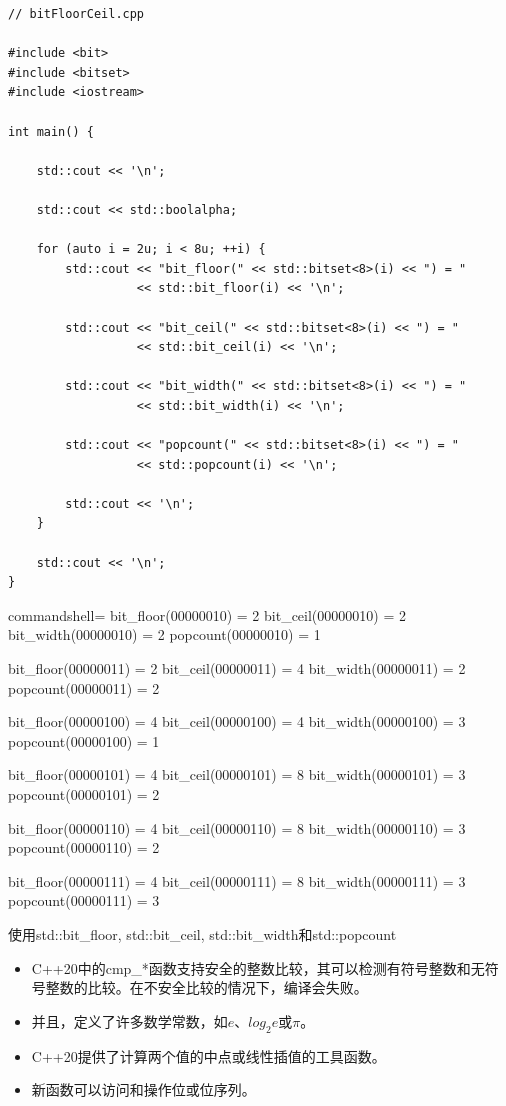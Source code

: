 \begin{lstlisting}[style=styleCXX]
// bitFloorCeil.cpp

#include <bit>
#include <bitset>
#include <iostream>

int main() {
	
	std::cout << '\n';
	
	std::cout << std::boolalpha;
	
	for (auto i = 2u; i < 8u; ++i) {
		std::cout << "bit_floor(" << std::bitset<8>(i) << ") = "
		          << std::bit_floor(i) << '\n';
		
		std::cout << "bit_ceil(" << std::bitset<8>(i) << ") = "
		          << std::bit_ceil(i) << '\n';
		
		std::cout << "bit_width(" << std::bitset<8>(i) << ") = "
		          << std::bit_width(i) << '\n';
		
		std::cout << "popcount(" << std::bitset<8>(i) << ") = "
		          << std::popcount(i) << '\n';
		
		std::cout << '\n';
	}

	std::cout << '\n';
}
\end{lstlisting}

\begin{tcblisting}{commandshell={}}
bit_floor(00000010) = 2
bit_ceil(00000010) = 2
bit_width(00000010) = 2
popcount(00000010) = 1

bit_floor(00000011) = 2
bit_ceil(00000011) = 4
bit_width(00000011) = 2
popcount(00000011) = 2

bit_floor(00000100) = 4
bit_ceil(00000100) = 4
bit_width(00000100) = 3
popcount(00000100) = 1

bit_floor(00000101) = 4
bit_ceil(00000101) = 8
bit_width(00000101) = 3
popcount(00000101) = 2

bit_floor(00000110) = 4
bit_ceil(00000110) = 8
bit_width(00000110) = 3
popcount(00000110) = 2

bit_floor(00000111) = 4
bit_ceil(00000111) = 8
bit_width(00000111) = 3
popcount(00000111) = 3
\end{tcblisting}

\begin{center}
使用std::bit\_floor, std::bit\_ceil, std::bit\_width和std::popcount
\end{center}

\begin{tcolorbox}[breakable,enhanced jigsaw,colback=mygreen!5!white,colframe=mygreen!75!black,title={总结}]
	
\begin{itemize}
\item 
C++20中的cmp\_*函数支持安全的整数比较，其可以检测有符号整数和无符号整数的比较。在不安全比较的情况下，编译会失败。

\item 
并且，定义了许多数学常数，如$e$、$log_2e$或$\pi$。

\item 
C++20提供了计算两个值的中点或线性插值的工具函数。

\item 
新函数可以访问和操作位或位序列。
\end{itemize}
	
\end{tcolorbox}
\newpage